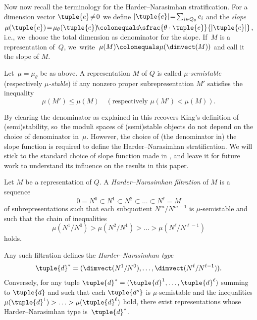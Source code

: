 Now now recall the terminology for the Harder--Narasimhan stratification.
For a dimension vector $\tuple{e} \!\neq\! 0$ we define $|\tuple{e}| \!=\! \sum_{i \in Q_0} e_i$
and the \emph{slope}~\hbox{$\mu(\tuple{e}) \!=\! \mu_\theta(\tuple{e}) \!\colonequals\! \sfrac{\theta\cdot\tuple{e}}{|\tuple{e}|}$},
i.e., we~choose the total dimension as denominator for the slope.
If~$M$ is a representation of~$Q$, we~write~$\mu(M)\colonequals\mu(\dimvect(M))$ and call it the slope of $M$.

\begin{definition}
Let~$\mu=\mu_\theta$ be as above.
A representation $M$ of $Q$ is called \emph{$\mu$\nobreakdash-semistable} (respectively \emph{$\mu$\nobreakdash-stable})
if any nonzero proper subrepresentation $M'$ satisfies the inequality
\begin{equation*}
\mu(M') \leq \mu(M) \quad(\text{respectively } \mu(M') < \mu(M)).
\end{equation*}
\end{definition}

By clearing the denominator as explained in \cite[Rem.\,2.3]{MR3199484}
this recovers King's definition of (semi)stability, so~the moduli spaces of (semi)stable objects do not depend on the choice of denominator in~$\mu$.
However, the choice of (the denominator in) the slope function
is required to define the Harder--Narasimhan stratification.
We will stick to the standard choice of slope function made in \cite{MR1974891},
and leave it for future work to understand its influence on the results in this paper.

\begin{definition}
Let $M$ be a representation of $Q$.
A \emph{Harder--Narasimhan filtration} of $M$ is a sequence
\begin{equation*}
0 = N^0 \subset N^1 \subset N^2 \subset \ldots \subset N^\ell = M
\end{equation*}
of subrepresentations such that each subquotient $N^m/N^{m-1}$ is $\mu$\nobreakdash-semistable
and such that the chain of inequalities
\begin{equation*}
\mu(N^1/N^0) > \mu(N^2/N^1) > \ldots > \mu(N^\ell/N^{\ell-1})
\end{equation*}
holds.
\end{definition}

\begin{remark}
Any such filtration defines the \emph{Harder--Narasimhan type}
\begin{equation*}
\tuple{d}^* = (\dimvect(N^1/N^0),\ldots,\dimvect(N^{\ell}/N^{\ell-1})).
\end{equation*}
Conversely, for any tuple
$\tuple{d}^* = (\tuple{d}^1,\ldots,\tuple{d}^{\ell})$ summing to $\tuple{d}$ and
such that each $\tuple{d^s}$ is $\mu$\nobreakdash-semistable and
the inequalities $\mu(\tuple{d}^1)>\ldots>\mu(\tuple{d}^{\ell})$ hold,
there exist representations whose Harder--Narasimhan type is~$\tuple{d}^*$.
\end{remark}


